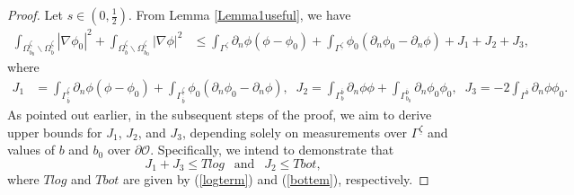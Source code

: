 \documentclass[11pt]{article}
\begin{document}
\begin{proof}
	Let $s\in \left(0,\frac{1}{2} \right)$.   From Lemma \ref{Lemma1useful}, we have 
	\begin{equation}\label{step1inproof}
		\begin{split}
			\displaystyle\int_{\Omega_{b_0}^{\underline{\zeta}}\backslash \Omega_{b}^{\underline{\zeta}}}\left|\nabla\phi_0\right|^2+\displaystyle\int_{\Omega_{b}^{\underline{\zeta}}\backslash \Omega_{b_0}^{\underline{\zeta}}}\left|\nabla\phi\right|^2
			&\leq \displaystyle\int_{\Gamma^{\underline{\zeta}}} \partial_n\phi(\phi-\phi_0)+\displaystyle\int_{\Gamma^{\underline{\zeta}}} \phi_0(\partial_n\phi_0-\partial_n\phi)+J_1+J_2+J_3,
		\end{split}
	\end{equation}
	where
	\begin{equation*}
		\begin{split}
			J_1&=\displaystyle\int_{\Gamma_{\overline{b}}^{\underline{\zeta}}} \partial_n\phi(\phi-\phi_0)+\displaystyle\int_{\Gamma_{\overline{b}}^{\underline{\zeta}}} \phi_0(\partial_n\phi_0-\partial_n\phi),\;\;
			J_2=\displaystyle\int_{\Gamma_{b}^{\overline{b}}} \partial_n\phi \phi + \displaystyle\int_{\Gamma_{b_0}^{\overline{b}}} \partial_n\phi_0 \phi_0,\;\;
			J_3=-2\displaystyle\int_{\Gamma^{\overline{b}}} \partial_n\phi \phi_0.
		\end{split}
	\end{equation*}
	As pointed out earlier, in the subsequent steps of the proof, we aim to derive upper bounds for $J_1$, $J_2$, and  $J_3$, depending solely on measurements over $\Gamma^{\underline{\zeta}}$ and values of $b$ and $b_0$ over $  \partial \mathcal O$. Specifically, we intend to demonstrate that 
	\begin{equation}\label{whatwewanttoproofinthis prop}
		J_1+J_3\leq Tlog \ \ \textrm{ and } \ \ 
		J_2\leq Tbot,
	\end{equation}
	where $Tlog$ and $Tbot$ are given by (\ref{logterm}) and (\ref{bottem}), respectively.
	

\end{proof}
\end{document}
